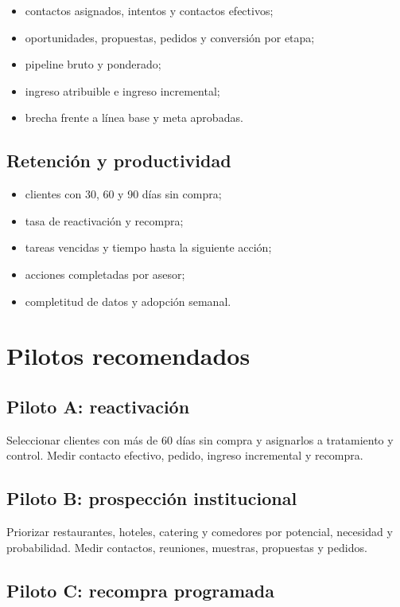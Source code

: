 \documentclass[11pt,a4paper]{article}
\begin{document}
\begin{itemize}
  \item contactos asignados, intentos y contactos efectivos;
  \item oportunidades, propuestas, pedidos y conversión por etapa;
  \item pipeline bruto y ponderado;
  \item ingreso atribuible e ingreso incremental;
  \item brecha frente a línea base y meta aprobadas.
\end{itemize}

\subsection{Retención y productividad}

\begin{itemize}
  \item clientes con 30, 60 y 90 días sin compra;
  \item tasa de reactivación y recompra;
  \item tareas vencidas y tiempo hasta la siguiente acción;
  \item acciones completadas por asesor;
  \item completitud de datos y adopción semanal.
\end{itemize}

\section{Pilotos recomendados}

\subsection{Piloto A: reactivación}

Seleccionar clientes con más de 60 días sin compra y asignarlos a tratamiento y
control. Medir contacto efectivo, pedido, ingreso incremental y recompra.

\subsection{Piloto B: prospección institucional}

Priorizar restaurantes, hoteles, catering y comedores por potencial, necesidad y
probabilidad. Medir contactos, reuniones, muestras, propuestas y pedidos.

\subsection{Piloto C: recompra programada}
\end{document}
